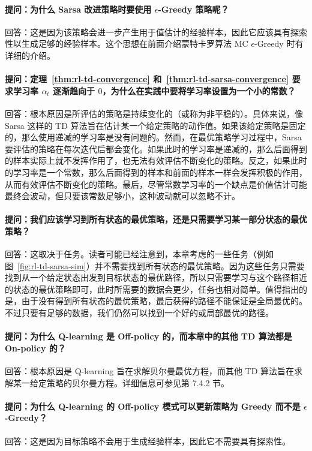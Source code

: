 \paragraph{提问：为什么 Sarsa 改进策略时要使用 $\epsilon$-Greedy 策略呢？}
回答：这是因为该策略会进一步产生用于值估计的经验样本，因此它应该具有探索性以生成足够的经验样本。这个思想在前面介绍蒙特卡罗算法 MC $\epsilon$-Greedy 时有详细的介绍。

\paragraph{提问：定理~\ref{thm:rl-td-convergence} 和~\ref{thm:rl-td-sarsa-convergence} 要求学习率 $\alpha_t$ 逐渐趋向于 $0$，为什么在实践中要将学习率设置为一个小的常数？}
回答：根本原因是所评估的策略是持续变化的（或称为非平稳的）。具体来说，像 Sarsa 这样的 TD 算法旨在估计某一个给定策略的动作值。如果该给定策略是固定的，那么使用递减的学习率是没有问题的。然而，在最优策略学习过程中，Sarsa 要评估的策略在每次迭代后都会变化。如果此时的学习率是递减的，那么后面得到的样本实际上就不发挥作用了，也无法有效评估不断变化的策略。反之，如果此时的学习率是一个常数，那么后面得到的样本和前面的样本一样会发挥积极的作用，从而有效评估不断变化的策略。最后，尽管常数学习率的一个缺点是价值估计可能最终会波动，但只要该常数足够小，这种波动就可以忽略不计。

\paragraph{提问：我们应该学习到所有状态的最优策略，还是只需要学习某一部分状态的最优策略？}
回答：这取决于任务。读者可能已经注意到，本章考虑的一些任务（例如图~\ref{fig:rl-td-sarsa-sim}）并不需要找到所有状态的最优策略。因为这些任务只需要找到从一个给定状态出发到目标状态的最优路径，所以只需要学习与这个路径相近的状态的最优策略即可，此时所需要的数据会更少，任务也相对简单。值得指出的是，由于没有得到所有状态的最优策略，最后获得的路径不能保证是全局最优的。不过只要有足够的数据，我们仍然可以找到一个好的或局部最优的路径。

\paragraph{提问：为什么 Q-learning 是 Off-policy 的，而本章中的其他 TD 算法都是 On-policy 的？}
回答：根本原因是 Q-learning 旨在求解贝尔曼最优方程，而其他 TD 算法旨在求解某一给定策略的贝尔曼方程。详细信息可参见第 7.4.2 节。

\paragraph{提问：为什么 Q-learning 的 Off-policy 模式可以更新策略为 Greedy 而不是 $\epsilon$-Greedy？}
回答：这是因为目标策略不会用于生成经验样本，因此它不需要具有探索性。
